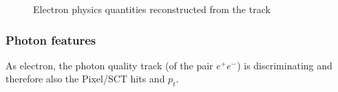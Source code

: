 \documentclass[a4paper, oneside]{book}
\begin{document}
				\begin{figure}
					\centering
					 \quad
					\newline
					 \quad
					\caption{Electron physics quantities reconstructed from the track}
					\label{fig:el_physics_quantities}
				\end{figure}
				
				
				
				\subsubsection{Photon features}
				As electron, the photon quality track (of the pair $e^{+}e^{-}$) is discriminating and therefore also the Pixel/SCT hits and $p_t$.
				
\end{document}
